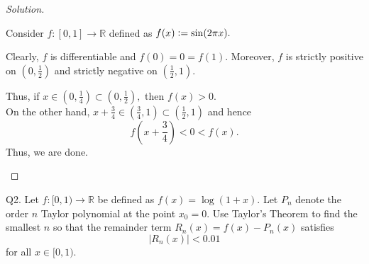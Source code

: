 \documentclass[12pt]{article}
\theoremstyle{definition}
\newenvironment{soln}{\begin{proof}[Solution]}{\end{proof}}
\newcommand{\md}[1]{\left\lvert #1 \right\lvert}
\begin{document}
\begin{soln}
\begin{enumerate}
		Consider $f:[0, 1] \to \mathbb{R}$ defined as $f(x) \vcentcolon= \sin(2\pi x).$

		Clearly, $f$ is differentiable and $f(0) = 0 = f(1).$ Moreover, $f$ is strictly positive on $\left(0, \frac{1}{2}\right)$ and strictly negative on $\left(\frac{1}{2}, 1\right).$

		Thus, if $x \in \left(0, \frac{1}{4}\right) \subset \left(0, \frac{1}{2}\right),$ then $f(x) > 0.$ \\
		On the other hand, $x + \frac{3}{4} \in \left(\frac{3}{4}, 1\right) \subset \left(\frac{1}{2}, 1\right)$ and hence
		\begin{equation*} 
			f\left(x + \frac{3}{4}\right) < 0 < f(x).
		\end{equation*}
		Thus, we are done. \qedhere
	\end{enumerate}
\end{soln}

\newpage

Q2. Let $f:[0, 1) \to \mathbb{R}$ be defined as $f(x) = \log(1 + x).$ Let $P_n$ denote the order $n$ Taylor polynomial at the point $x_0 = 0.$ Use Taylor's Theorem to find the smallest $n$ so that the remainder term $R_n(x) = f(x) - P_n(x)$ satisfies 
\begin{equation*} 
	\md{R_n(x)} < 0.01
\end{equation*}
for all $x \in [0, 1).$
\end{document}
